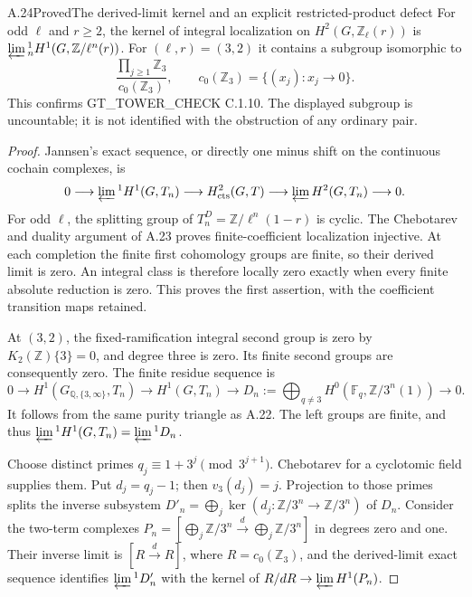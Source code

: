 \begin{result}{A.24}{Proved}{The derived-limit kernel and an explicit restricted-product defect}
\label{coh:limone}
For odd $\ell$ and $r\geq2$, the kernel of integral localization
on $H^2(G,\mathbb Z_\ell(r))$ is
$\varprojlim{}^1_nH^1(G,\mathbb Z/\ell^n(r))$.
For $(\ell,r)=(3,2)$ it contains a subgroup isomorphic to
\[
       \frac{\prod_{j\geq1}\mathbb Z_3}{c_0(\mathbb Z_3)},
 \qquad c_0(\mathbb Z_3)=\{(x_j):x_j\to0\}.
\]
This confirms GT\_TOWER\_CHECK C.1.10. The displayed subgroup is
uncountable; it is not identified with the obstruction of any ordinary
pair.
\end{result}
\begin{proof}
Jannsen's exact sequence, or directly one minus shift on the continuous
cochain complexes, is
\[
 0\longrightarrow\varprojlim{}^1H^1(G,T_n)
 \longrightarrow H^2_{\rm cts}(G,T)
 \longrightarrow\varprojlim H^2(G,T_n)\longrightarrow0.
\]
For odd $\ell$, the splitting group of
$T_n^D=\mathbb Z/\ell^n(1-r)$ is cyclic. The Chebotarev and duality
argument of A.23 proves finite-coefficient localization injective.
At each completion the finite first cohomology groups are finite, so
their derived limit is zero. An integral class is therefore locally
zero exactly when every finite absolute reduction is zero. This proves
the first assertion, with the coefficient transition maps retained.

At $(3,2)$, the fixed-ramification integral second group is zero by
$K_2(\mathbb Z)\{3\}=0$, and degree three is zero. Its finite
second groups are consequently zero. The finite residue sequence is
\[
 0\to H^1(G_{\mathbb Q,\{3,\infty\}},T_n)
 \to H^1(G,T_n)\to
 D_n:=\bigoplus_{q\ne3}H^0(\mathbb F_q,\mathbb Z/3^n(1))\to0.
\]
It follows from the same purity triangle as A.22. The left groups are
finite, and thus $\varprojlim{}^1H^1(G,T_n)=\varprojlim{}^1D_n$.

Choose distinct primes $q_j\equiv1+3^j\pmod{3^{j+1}}$.
Chebotarev for a cyclotomic field supplies them. Put $d_j=q_j-1$;
then $v_3(d_j)=j$. Projection to those primes splits the inverse
subsystem
$D'_n=\bigoplus_j\ker(d_j:\mathbb Z/3^n\to\mathbb Z/3^n)$
of $D_n$. Consider the two-term complexes
$P_n=[\bigoplus_j\mathbb Z/3^n\xrightarrow{d}
\bigoplus_j\mathbb Z/3^n]$ in degrees zero and one. Their inverse
limit is $[R\xrightarrow{d}R]$, where $R=c_0(\mathbb Z_3)$,
and the derived-limit exact sequence identifies
$\varprojlim{}^1D'_n$ with the kernel of
$R/dR\to\varprojlim H^1(P_n)$.


\end{proof}
